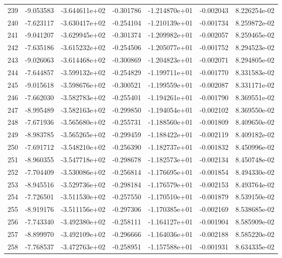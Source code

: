 \begin{tabular}{rrrrrrr}
 239 &  -9.053583 & -3.644611e+02 & -0.301786 & -1.214870e+01 &   -0.002043 &  8.226254e-02 \\
 240 &  -7.623117 & -3.630417e+02 & -0.254104 & -1.210139e+01 &   -0.001734 &  8.259872e-02 \\
 241 &  -9.041207 & -3.629945e+02 & -0.301374 & -1.209982e+01 &   -0.002057 &  8.259465e-02 \\
 242 &  -7.635186 & -3.615232e+02 & -0.254506 & -1.205077e+01 &   -0.001752 &  8.294523e-02 \\
 243 &  -9.026063 & -3.614468e+02 & -0.300869 & -1.204823e+01 &   -0.002071 &  8.294805e-02 \\
 244 &  -7.644857 & -3.599132e+02 & -0.254829 & -1.199711e+01 &   -0.001770 &  8.331583e-02 \\
 245 &  -9.015618 & -3.598676e+02 & -0.300521 & -1.199559e+01 &   -0.002087 &  8.331171e-02 \\
 246 &  -7.662030 & -3.582783e+02 & -0.255401 & -1.194261e+01 &   -0.001790 &  8.369551e-02 \\
 247 &  -8.995489 & -3.582163e+02 & -0.299850 & -1.194054e+01 &   -0.002102 &  8.369550e-02 \\
 248 &  -7.671936 & -3.565680e+02 & -0.255731 & -1.188560e+01 &   -0.001809 &  8.409650e-02 \\
 249 &  -8.983785 & -3.565265e+02 & -0.299459 & -1.188422e+01 &   -0.002119 &  8.409182e-02 \\
 250 &  -7.691712 & -3.548210e+02 & -0.256390 & -1.182737e+01 &   -0.001832 &  8.450996e-02 \\
 251 &  -8.960355 & -3.547718e+02 & -0.298678 & -1.182573e+01 &   -0.002134 &  8.450748e-02 \\
 252 &  -7.704409 & -3.530086e+02 & -0.256814 & -1.176695e+01 &   -0.001854 &  8.494330e-02 \\
 253 &  -8.945516 & -3.529736e+02 & -0.298184 & -1.176579e+01 &   -0.002153 &  8.493764e-02 \\
 254 &  -7.726501 & -3.511530e+02 & -0.257550 & -1.170510e+01 &   -0.001879 &  8.539150e-02 \\
 255 &  -8.919176 & -3.511156e+02 & -0.297306 & -1.170385e+01 &   -0.002169 &  8.538685e-02 \\
 256 &  -7.743340 & -3.492380e+02 & -0.258111 & -1.164127e+01 &   -0.001904 &  8.585909e-02 \\
 257 &  -8.899970 & -3.492109e+02 & -0.296666 & -1.164036e+01 &   -0.002188 &  8.585220e-02 \\
 258 &  -7.768537 & -3.472763e+02 & -0.258951 & -1.157588e+01 &   -0.001931 &  8.634335e-02 \\

\end{tabular}
